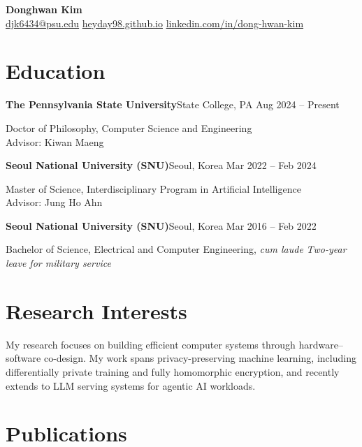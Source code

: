 \documentclass[11pt,letterpaper]{article}
\newcommand{\entry}[2]{\textbf{#1}\hfill #2\par}
\begin{document}
\begin{center}
  {\LARGE\bfseries Donghwan Kim}\\[0.45em]
  \href{mailto:djk6434@psu.edu}{djk6434@psu.edu}
  \quad\textbullet\quad \href{https://heyday98.github.io/}{heyday98.github.io}
  \quad\textbullet\quad \href{https://www.linkedin.com/in/dong-hwan-kim/}{linkedin.com/in/dong-hwan-kim}
\end{center}

\section{Education}

\entry{The Pennsylvania State University}{State College, PA \quad Aug 2024 -- Present}
Doctor of Philosophy, Computer Science and Engineering \\
Advisor: Kiwan Maeng

\vspace{0.4em}
\entry{Seoul National University (SNU)}{Seoul, Korea \quad Mar 2022 -- Feb 2024}
Master of Science, Interdisciplinary Program in Artificial Intelligence \\
Advisor: Jung Ho Ahn

\vspace{0.4em}
\entry{Seoul National University (SNU)}{Seoul, Korea \quad Mar 2016 -- Feb 2022}
Bachelor of Science, Electrical and Computer Engineering, \textit{cum laude}
\hfill {\footnotesize\itshape Two-year leave for military service}

\section{Research Interests}

My research focuses on building efficient computer systems through hardware--software
co-design. My work spans privacy-preserving machine learning, including differentially
private training and fully homomorphic encryption, and recently extends to LLM
serving systems for agentic AI workloads.

\section{Publications}
\end{document}
